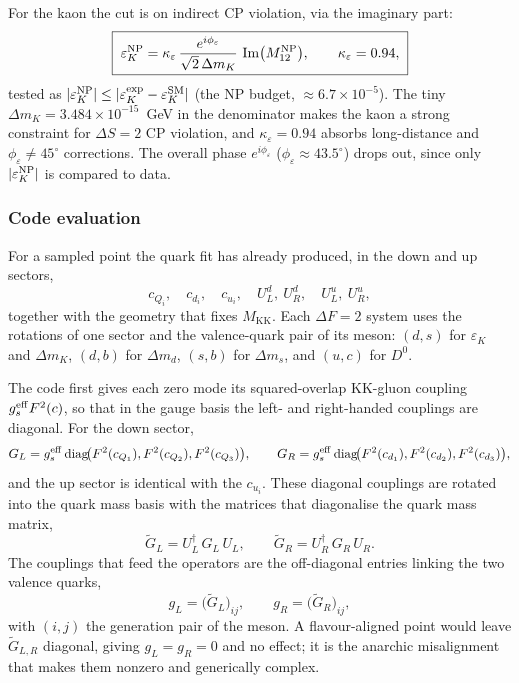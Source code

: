 \documentclass[11pt]{article}
\newcommand{\MKK}{M_{\mathrm{KK}}}
\newcommand{\Mtwelve}{M_{12}}
\newcommand{\eps}{\varepsilon}
\newcommand{\dmk}{\Delta m_K}
\newcommand{\epsK}{\varepsilon_K}
\begin{document}
For the kaon the cut is on indirect CP violation, via the imaginary part:
\begin{equation}
\boxed{\;
\epsK^{\rm NP} = \kappa_\eps\,\frac{e^{i\phi_\eps}}{\sqrt2\,\dmk}\,
\operatorname{Im}\!\big(\Mtwelve^{\rm NP}\big),
\qquad \kappa_\eps=0.94,
\;}
\end{equation}
tested as $|\epsK^{\rm NP}|\le|\epsK^{\rm exp}-\epsK^{\rm SM}|$ (the NP budget,
$\approx6.7\times10^{-5}$). The tiny $\dmk=3.484\times10^{-15}$~GeV in the
denominator makes the kaon a strong constraint for $\Delta S=2$ CP violation, and
$\kappa_\eps=0.94$ absorbs long-distance and $\phi_\eps\neq45^\circ$ corrections.
The overall phase $e^{i\phi_\eps}$ ($\phi_\eps\approx43.5^\circ$) drops out, since
only $|\epsK^{\rm NP}|$ is compared to data.

\subsubsection*{Code evaluation}
\noindent For a sampled point the quark fit has already produced, in the down and
up sectors,
\begin{equation}
c_{Q_i},\quad c_{d_i},\quad c_{u_i},\quad
U_L^{d},\ U_R^{d},\quad U_L^{u},\ U_R^{u},
\end{equation}
together with the geometry that fixes $\MKK$. Each $\Delta F=2$ system uses the
rotations of one sector and the valence-quark pair of its meson: $(d,s)$ for
$\epsK$ and $\Delta m_K$, $(d,b)$ for $\Delta m_d$, $(s,b)$ for $\Delta m_s$, and
$(u,c)$ for $D^0$.

\smallskip
\noindent The code first gives each zero mode its squared-overlap KK-gluon
coupling $g_s^{\rm eff}F^2(c)$, so that in the gauge basis the left- and
right-handed couplings are diagonal. For the down sector,
\begin{equation}
G_L=g_s^{\rm eff}\,\mathrm{diag}\!\big(F^2(c_{Q_1}),F^2(c_{Q_2}),F^2(c_{Q_3})\big),
\qquad
G_R=g_s^{\rm eff}\,\mathrm{diag}\!\big(F^2(c_{d_1}),F^2(c_{d_2}),F^2(c_{d_3})\big),
\end{equation}
and the up sector is identical with the $c_{u_i}$. These diagonal couplings are
rotated into the quark mass basis with the matrices that diagonalise the quark mass
matrix,
\begin{equation}
\widetilde G_L=U_L^{\dagger}\,G_L\,U_L,
\qquad
\widetilde G_R=U_R^{\dagger}\,G_R\,U_R .
\end{equation}
The couplings that feed the operators are the off-diagonal entries linking the two
valence quarks,
\begin{equation}
g_L=\big(\widetilde G_L\big)_{ij},
\qquad
g_R=\big(\widetilde G_R\big)_{ij},
\end{equation}
with $(i,j)$ the generation pair of the meson. A flavour-aligned point would leave
$\widetilde G_{L,R}$ diagonal, giving $g_L=g_R=0$ and no effect; it is the anarchic
misalignment that makes them nonzero and generically complex.
\end{document}

